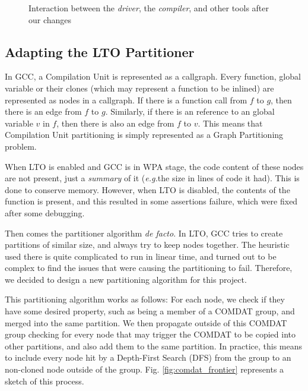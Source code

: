 \documentclass[runningheads]{llncs}
\begin{document}
\begin{figure}
{{
}
}%
\caption{Interaction between the \textit{driver}, the \textit{compiler}, and other tools
after our changes}
\label{fig:gnu_toolchain_patched}
\end{figure}

\subsection{Adapting the LTO Partitioner}

In GCC, a Compilation Unit is represented as a callgraph. Every function,
global variable or their clones (which may represent a function to be inlined)
are represented as nodes in a callgraph. If there is a function call from $f$
to $g$, then there is an edge from $f$ to $g$. Similarly, if there is an
reference to an global variable $v$ in $f$, then there is also an edge from $f$
to $v$. This means that Compilation Unit partitioning is simply represented as
a Graph Partitioning problem. 

When LTO is enabled and GCC is in WPA stage, the code content of these nodes
are not present, just a \textit{summary} of it (\textit{e.g.}the size
in lines of code it had). This is done to conserve memory. However,
when LTO is disabled, the contents of the function is present, and this
resulted in some assertions failure, which were fixed after some debugging.

Then comes the partitioner algorithm \textit{de facto}. In LTO, GCC tries to create
partitions of similar size, and always try to keep nodes together. The
heuristic used there is quite complicated to run in linear time, and turned
out to be complex to find the issues that were causing the partitioning to fail.
Therefore, we decided to design a new partitioning algorithm for this project.

This partitioning algorithm works as follows: For each node, we check if they
have some desired property, such as being a member of a COMDAT group, and
merged into the same partition. We then propagate outside of this COMDAT group
checking for every node that may trigger the COMDAT to be copied into other
partitions, and also add them to the same partition. In practice,
this means to include every node hit by a Depth-First
Search (DFS) from the group to an non-cloned node outside of the group.
Fig. \ref{fig:comdat_frontier} represents a sketch of this process.
\end{document}
